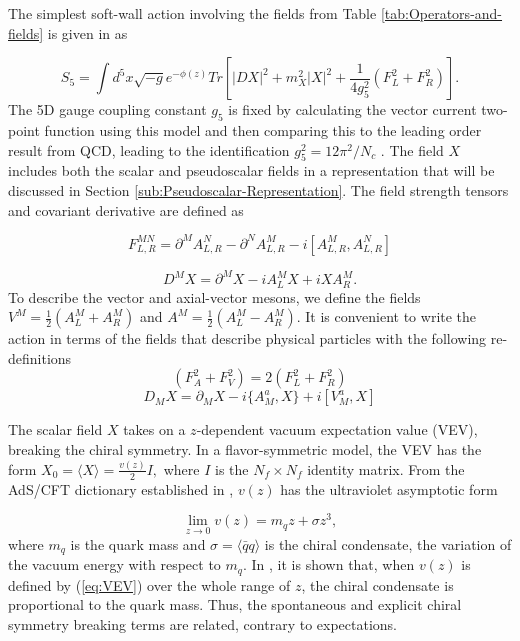 The simplest soft-wall action involving the fields from Table \ref{tab:Operators-and-fields}
is given in \cite{karch-katz-son-adsqcd} as 

\begin{equation}
S_{5}=\int d^{5}x\sqrt{-g}e^{-\phi(z)}Tr\left[|DX|^{2}+m_{X}^{2}|X|^{2}+\frac{1}{4g_{5}^{2}}(F_{L}^{2}+F_{R}^{2})\right].
\end{equation}
The 5D gauge coupling constant $g_{5}$ is fixed by calculating the vector current two-point function using this model and then comparing this to the leading order result from QCD, leading to the identification $g_{5}^{2}=12\pi^{2}/N_{c}$ \cite{stephanov-katz-son}. 
The field $X$ includes both the scalar and pseudoscalar fields in a representation that will be discussed in Section \ref{sub:Pseudoscalar-Representation}.
The field strength tensors and covariant derivative are defined as

\[
F_{L,R}^{MN}=\partial^{M}A_{L,R}^{N}-\partial^{N}A_{L,R}^{M}-i[A_{L,R}^{M},A_{L,R}^{N}]
\]


\[
D^{M}X=\partial^{M}X-iA_{L}^{M}X+iXA_{R}^{M}.
\]
To describe the vector and axial-vector mesons, we define the fields $V^{M}=\frac{1}{2}(A_{L}^{M}+A_{R}^{M})$ and $A^{M}=\frac{1}{2}(A_{L}^{M}-A_{R}^{M})$.
It is convenient to write the action in terms of the fields that describe physical particles with the following re-definitions
\begin{equation}
(F_{A}^{2}+F_{V}^{2})=2(F_{L}^{2}+F_{R}^{2})
\end{equation}
\begin{equation}
D_{M}X=\partial_{M}X-i\{A_{M}^{a},X\}+i[V_{M}^{a},X]\label{eq:covariant_der}
\end{equation}


The scalar field $X$ takes on a $z$-dependent vacuum expectation value (VEV), breaking the chiral symmetry. 
In a flavor-symmetric model, the VEV has the form $X_{0}=\langle X\rangle=\frac{v(z)}{2}I,$ where $I$ is the $N_{f}\times N_{f}$ identity matrix. 
From the AdS/CFT dictionary established in \cite{maldacena,klebanov-witten}, $v(z)$
has the ultraviolet asymptotic form

\begin{equation}
\lim_{z\rightarrow0}v(z)=m_{q}z+\sigma z^{3},\label{eq:VEV}
\end{equation}
where $m_{q}$ is the quark mass and $\sigma=\langle\bar{q}q\rangle$ is the chiral condensate, the variation of the vacuum energy with respect to $m_{q}$. 
In \cite{karch-katz-son-adsqcd}, it is shown that, when $v(z)$ is defined by (\ref{eq:VEV}) over the whole range of $z$, the chiral condensate is proportional to the quark mass.
Thus, the spontaneous and explicit chiral symmetry breaking terms are related, contrary to expectations.

